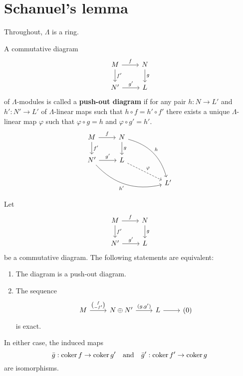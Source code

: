 

\section{Schanuel's lemma}


Throughout, $\Lambda$ is a ring.


\begin{definition}
A commutative diagram
\[
\begin{tikzcd}
	M\ar[r,"f"]\ar[d,"f'"] & N\ar[d,"g"] \\
	N'\ar[r,"g'"] & L	
\end{tikzcd}
\]
of $\Lambda$-modules is called a \textbf{push-out diagram} if for any pair $h:N\to L'$ and $h':N'\to L'$ of $\Lambda$-linear maps such that $h\circ f = h' \circ f'$ there exists a unique $\Lambda$-linear map $\varphi$ such that $\varphi\circ g = h$ and $\varphi\circ g' = h'$. 
%
\[
\begin{tikzcd}
	M\ar[r,"f"]\ar[d,"f'"] & N\ar[d,"g"]\ar[ddrr,bend left,"h"] & \\
	N'\ar[r,"g'"]\ar[drrr,bend right,"h'"'] & L \ar[drr,dashed,"\varphi"] & \\
	   &   &   & L'
\end{tikzcd}
\]
% 
\end{definition}


\begin{proposition}\label{2.1.1}
Let
\[
\begin{tikzcd}
	M\ar[r,"f"]\ar[d,"f'"] & N\ar[d,"g"] \\
	N'\ar[r,"g'"] & L	
\end{tikzcd}
\]
be a commutative diagram. The following statements are equivalent:
\begin{enumerate}
\item The diagram is a push-out diagram.
\item The sequence
\[
\begin{tikzcd}
	M \ar[r,"\binom{f}{-f'}"] & N \oplus N' \ar[r,"{(g,g')}"] & L \ar[r] & (0)
\end{tikzcd}
\]
is exact.
\end{enumerate}
In either case, the induced maps
\[
\bar g : \operatorname{coker} f \to \operatorname{coker} g' \quad\text{and}\quad
\bar g' : \operatorname{coker} f' \to \operatorname{coker} g
\]
are isomorphisms.
\end{proposition}


